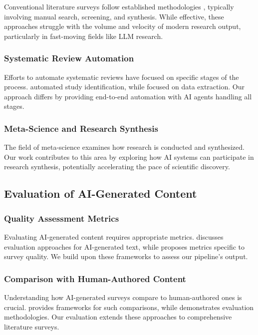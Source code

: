 Conventional literature surveys follow established methodologies \cite{kitchenham2004procedures}, typically involving manual search, screening, and synthesis. While effective, these approaches struggle with the volume and velocity of modern research output, particularly in fast-moving fields like LLM research.

\subsubsection{Systematic Review Automation}

Efforts to automate systematic reviews have focused on specific stages of the process. \cite{wallace2016identifying} automated study identification, while \cite{thomas2011automating} focused on data extraction. Our approach differs by providing end-to-end automation with AI agents handling all stages.

\subsubsection{Meta-Science and Research Synthesis}

The field of meta-science \cite{ioannidis2018meta} examines how research is conducted and synthesized. Our work contributes to this area by exploring how AI systems can participate in research synthesis, potentially accelerating the pace of scientific discovery.

\subsection{Evaluation of AI-Generated Content}

\subsubsection{Quality Assessment Metrics}

Evaluating AI-generated content requires appropriate metrics. \cite{zhang2023evaluating} discusses evaluation approaches for AI-generated text, while \cite{liu2023survey} proposes metrics specific to survey quality. We build upon these frameworks to assess our pipeline's output.

\subsubsection{Comparison with Human-Authored Content}

Understanding how AI-generated surveys compare to human-authored ones is crucial. \cite{wang2023large} provides frameworks for such comparisons, while \cite{liu2023survey} demonstrates evaluation methodologies. Our evaluation extends these approaches to comprehensive literature surveys.

